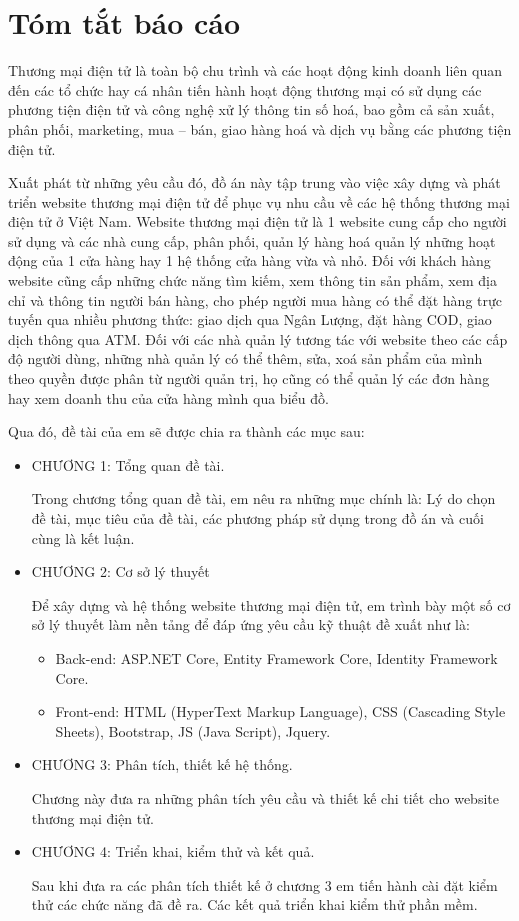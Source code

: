 \chapter*{Tóm tắt báo cáo}
Thương mại điện tử là toàn bộ chu trình và các hoạt động kinh doanh liên quan đến các tổ chức hay cá nhân tiến hành hoạt động thương mại có sử dụng các phương tiện điện tử và công nghệ xử lý thông tin số hoá, bao gồm cả sản xuất, phân phối, marketing, mua – bán, giao hàng hoá và dịch vụ bằng các phương tiện điện tử.
\par
Xuất phát từ những yêu cầu đó, đồ án này tập trung vào việc xây dựng và phát triển website thương mại điện tử để phục vụ nhu cầu về các hệ thống thương mại điện tử ở Việt Nam. Website thương mại điện tử là 1 website cung cấp cho người sử dụng và các nhà cung cấp, phân phối, quản lý hàng hoá quản lý những hoạt động của 1 cửa hàng hay 1 hệ thống cửa hàng vừa và nhỏ. Đối với khách hàng website cũng cấp những chức năng tìm kiếm, xem thông tin sản phẩm, xem địa chỉ và thông tin người bán hàng, cho phép người mua hàng có thể đặt hàng trực tuyến qua nhiều phương thức: giao dịch qua Ngân Lượng, đặt hàng COD, giao dịch thông qua ATM. Đối với các nhà quản lý tương tác với website theo các cấp độ người dùng, những nhà quản lý có thể thêm, sửa, xoá sản phẩm của mình theo quyền được phân từ người quản trị, họ cũng có thể quản lý các đơn hàng hay xem doanh thu của cửa hàng mình qua biểu đồ.
\par 
Qua đó, đề tài của em sẽ được chia ra thành các mục sau:
\begin{itemize}
\item CHƯƠNG 1: Tổng quan đề tài.
\par
Trong chương tổng quan đề tài, em nêu ra những mục chính là: Lý do chọn đề tài, mục tiêu của đề tài, các phương pháp sử dụng trong đồ án và cuối cùng là kết luận.
\item CHƯƠNG 2: Cơ sở lý thuyết
\par
Để xây dựng và hệ thống website thương mại điện tử, em trình bày một số cơ sở lý thuyết làm nền tảng để đáp ứng yêu cầu kỹ thuật đề xuất như là: 
\begin{itemize}
\item Back-end: ASP.NET Core, Entity Framework Core, Identity Framework Core.
\item Front-end: HTML (HyperText Markup Language), CSS (Cascading Style Sheets), Bootstrap, JS (Java Script), Jquery.
\end{itemize}
\item CHƯƠNG 3: Phân tích, thiết kế hệ thống.\par
Chương này đưa ra những phân tích yêu cầu và thiết kế chi tiết cho website thương mại điện tử.

\item CHƯƠNG 4: Triển khai, kiểm thử và kết quả.\par
Sau khi đưa ra các phân tích thiết kế ở chương 3 em tiến hành cài đặt kiểm thử các chức năng đã đề ra. Các kết quả triển khai kiểm thử phần mềm.

\end{itemize}

